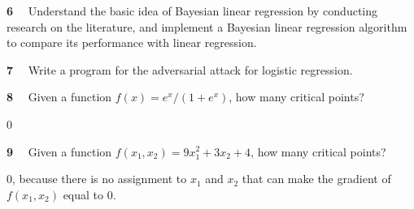 \begin{newquestion}{\textbf{6}~~}
Understand the basic idea of Bayesian linear regression by conducting research on the literature, and implement a Bayesian linear regression algorithm to compare its performance with linear regression. 
\end{newquestion}

\begin{newquestion}{\textbf{7}~~}
Write a program for the adversarial attack for logistic regression. 
\end{newquestion}

\begin{newquestion}{\textbf{8}~~}
Given a function $f(x)= e^x/(1+e^x)$, how many critical points? 
\end{newquestion}
\begin{newanswer*}
0
\end{newanswer*}

\begin{newquestion}{\textbf{9}~~}
Given a function $f(x_1,x_2)= 9x_1^2+3x_2+4$, how many critical points? 
\end{newquestion}
\begin{newanswer*}
0, because there is no assignment to $x_1$ and $x_2$ that can make the gradient of $f(x_1,x_2)$ equal to $0$. 
\end{newanswer*}

